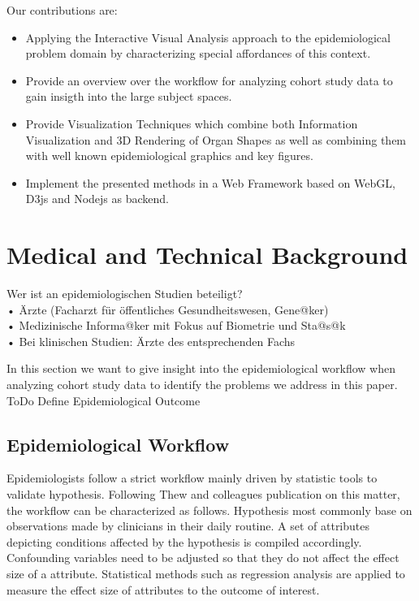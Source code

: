 \documentclass[journal]{style/vgtc}           %
\begin{document}
Our contributions are:
\begin{itemize}
	\item Applying the Interactive Visual Analysis approach to the epidemiological problem domain by characterizing special affordances of this context.
	\item Provide an overview over the workflow for analyzing cohort study data to gain insigth into the large subject spaces.
	\item Provide Visualization Techniques which combine both Information Visualization and 3D Rendering of Organ Shapes as well as combining them with well known epidemiological graphics and key figures.
	\item Implement the presented methods in a Web Framework based on WebGL, D3js and Nodejs as backend.
\end{itemize}



\section{Medical and Technical Background} \label{MedicalAndTechnicalBackground}
Wer ist an epidemiologischen Studien beteiligt?\\
•  Ärzte (Facharzt für öffentliches Gesundheitswesen, Gene@ker)\\
•  Medizinische Informa@ker mit Fokus auf Biometrie und Sta@s@k\\
•  Bei klinischen Studien: Ärzte des entsprechenden Fachs

In this section we want to give insight into the epidemiological workflow when analyzing cohort study data to identify the problems we address in this paper.
%
ToDo Define Epidemiological Outcome
%
\subsection{Epidemiological Workflow} \label{EpidemiologicalWorkflow}
Epidemiologists follow a strict workflow mainly driven by statistic tools to validate hypothesis.
%
Following Thew and colleagues publication on this matter, the workflow can be characterized as follows.
%
Hypothesis most commonly base on observations made by clinicians in their daily routine.
%
A set of attributes depicting conditions affected by the hypothesis is compiled accordingly.
%
Confounding variables need to be adjusted so that they do not affect the effect size of a attribute.
%
Statistical methods such as regression analysis are applied to measure the effect size of attributes to the outcome of interest.
%
\end{document}
